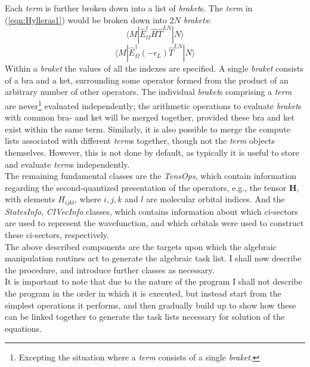 \noindent Each \emph{term} is further broken down into a list of \emph{braket}s. The \emph{term} 
in (\ref{eqn:Hylleras1}) would be broken down into $2N$ \emph{brakets}: 
\begin{equation}
\langle M | \hat{E}^{\dagger}_{\Omega} \hat{H} \hat{T}^{LN} | N \rangle  
\end{equation}
\begin{equation}
\langle M | \hat{E}^{\dagger}_{\Omega} (-\epsilon_{L}) \hat{T}^{LN} | N \rangle  
\end{equation}
\noindent Within a \emph{braket} the values of all the indexes are specified.
A single \emph{braket} consists of a bra and a ket, surrounding some operator
formed from the product of an arbitrary number of other operators.  The
individual \emph{braket}s comprising a \emph{term} are never\footnote{Excepting
the situation where a \emph{term} consists of a single \emph{braket}.}
evaluated independently; the arithmetic operations to evaluate \emph{braket}s
with common bra- and ket will be merged together, provided these bra and ket
exist within the same term. Similarly, it is also possible to merge the compute
lists associated with different \emph{term}s together, though not the
\emph{term} objects themselves. However, this is not done by default, as
typically it is useful to store and evaluate \emph{term}s independently.\\

\noindent The remaining fundamental classes are the \emph{TensOps}, which contain
information regarding the second-quantized presentation of the operators, e.g.,
the tensor $\mathbf{H}$, with elements $H_{ijkl}$, where $i, j, k$ and $l$ are
molecular orbital indices. And the \emph{StatesInfo}, \emph{CIVecInfo}
classes, which contains information about which ci-sectors are used to represent the 
wavefunction, and which orbitals were used to construct these ci-sectors,  respectively.\\

\noindent The above described components are the targets upon which the 
algebraic manipulation routines act to generate the algebraic task list.
I shall now describe the procedure, and introduce further classes as necessary.\\

\noindent It is important to note that due to the nature of the program I shall not describe the
program in the order in which it is executed, but instead start from the simplest operations it
performs, and then gradually build up to show how these can be linked together to
generate the task lists necessary for solution of the equations.

